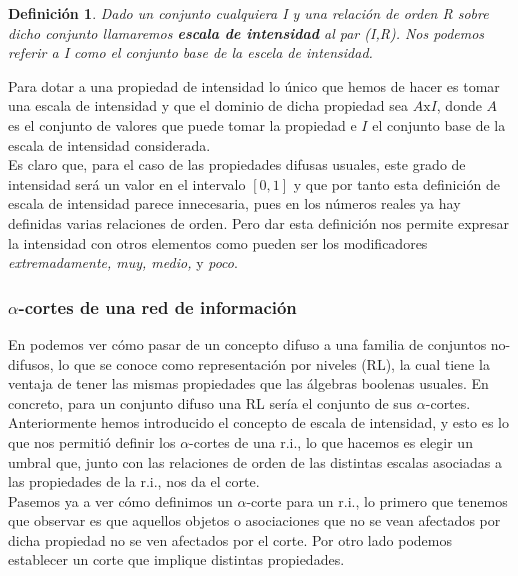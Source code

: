 \documentclass[10pt,a4paper]{article}
\newtheorem{definicion}{Definición}
\begin{document}
\begin{definicion}
\label{defiescala}
Dado un conjunto cualquiera I y una relación de orden R sobre dicho conjunto llamaremos \textit{\textbf{escala de intensidad}} al par (I,R). Nos podemos referir a I como el conjunto base de la escela de intensidad.
\end{definicion}

Para dotar a una propiedad de intensidad lo único que hemos de hacer es tomar una escala de intensidad y que el dominio de dicha propiedad sea $A\mathrm{x}I$, donde $A$ es el conjunto de valores que puede tomar la propiedad e $I$ el conjunto base de la escala de intensidad considerada.\\

Es claro que, para el caso de las propiedades difusas usuales, este grado de intensidad será un valor en el intervalo $[0,1]$ y que por tanto esta definición de escala de intensidad parece innecesaria, pues en los números reales ya hay definidas varias relaciones de orden. Pero dar esta definición nos permite expresar la intensidad con otros elementos como pueden ser los modificadores \textit{extremadamente, muy, medio,} y  \textit{poco}.\\

\subsubsection{$\alpha$-cortes de una red de información}

En \cite{artDanielRL} podemos ver cómo pasar de un concepto difuso a una familia de conjuntos no-difusos, lo que se conoce como representación por niveles (RL), la cual tiene la ventaja de tener las mismas propiedades que las álgebras boolenas usuales. En concreto, para un conjunto difuso una RL sería el conjunto de sus $\alpha$-cortes.\\

Anteriormente hemos introducido el concepto de escala de intensidad, y esto es lo que nos permitió definir los $\alpha$-cortes de una r.i., lo que hacemos es elegir un umbral que, junto con las relaciones de orden de las distintas escalas asociadas a las propiedades de la r.i., nos da el corte.\\

Pasemos ya a ver cómo definimos un $\alpha$-corte para un r.i., lo primero que tenemos que observar es que aquellos objetos o asociaciones que no se vean afectados por dicha propiedad no se ven afectados por el corte. Por otro lado podemos establecer un corte que implique distintas propiedades.
\end{document}
